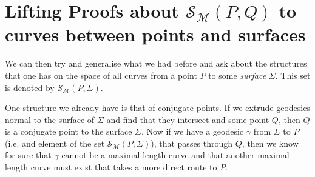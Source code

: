 \documentclass[10pt]{article}
\begin{document}
\begin{figure}[!h]
\centering
{} %

\end{figure}





\section{Lifting Proofs about $\mathcal{S}_{\mathcal{M}} (P,Q)$ to curves between points and surfaces}

We can then try and generalise what we had before and ask about the structures that one has on the space of all curves from a point $P$ to some \textit{surface} $\Sigma$. This set is denoted by $\mathcal{S}_{\mathcal{M}} (P,\Sigma)$.

One structure we already have is that of conjugate points. If we extrude geodesics normal to the surface of $\Sigma$ and find that they intersect and some point $Q$, then $Q$ is a conjugate point to the surface $\Sigma$. Now if we have a geodesic $\gamma$ from $\Sigma$ to $P$ (i.e. and element of the set $\mathcal{S}_{\mathcal{M}} (P,\Sigma)$), that passes through $Q$, then we know for sure that $\gamma$ cannot be a maximal length curve and that another maximal length curve must exist that takes a more direct route to $P$.
\end{document}
